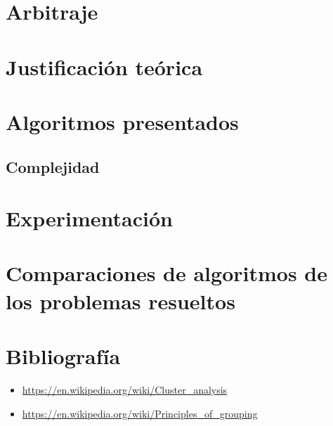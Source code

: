 \documentclass[8pt,a4paper]{article}
\begin{document}
\pagebreak

\section{Arbitraje}
\section{Justificación teórica}
\section{Algoritmos presentados}
\subsection{Complejidad}
\section{Experimentación}

\section{Comparaciones de algoritmos de los problemas resueltos}

\section{Bibliografía}
\begin{itemize}
	\item \url{https://en.wikipedia.org/wiki/Cluster_analysis}
	\item \url{https://en.wikipedia.org/wiki/Principles_of_grouping}
\end{itemize}
\end{document}
